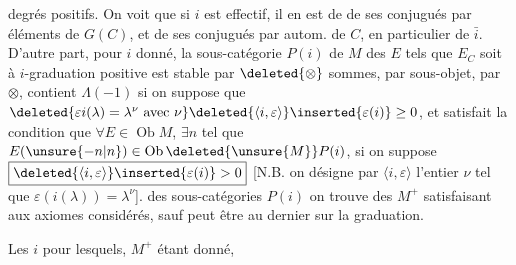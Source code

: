 degrés positifs. On voit que si $i$ est effectif, il en est de  de ses conjugués par éléments de $G(C)$, et de ses conjugués par autom. de $C$, en particulier de $\bar i$. D'autre part, pour $i$ donné, la sous-catégorie  $P(i)$ de $M$  des $E$ tels que $E_C$ soit à $i$-graduation positive est  stable par $\deleted{\otimes}$ sommes, par  sous-objet, par $\otimes$, contient  $\Lambda(-1)$ si on suppose que $\deleted{\varepsilon i(\lambda)=\lambda^\nu\ \text{avec }\nu}\deleted{\langle i,\varepsilon\rangle}\inserted{\varepsilon(i)}\geq 0$, et satisfait la condition que $\forall E\in\operatorname{Ob}M$, $\exists n$ tel que $E(\unsure{-n|n})\in\operatorname{Ob}\deleted{\unsure{M}}P(i)$, si on suppose $\boxed{\deleted{\langle i,\varepsilon\rangle}\inserted{\varepsilon(i)}>0}$ [N.B. on désigne par $\langle i,\varepsilon\rangle$ l'entier $\nu$ tel que $\varepsilon(i(\lambda))=\lambda^\nu$].   des sous-catégories $P(i)$ on trouve des $M^+$ satisfaisant aux axiomes considérés, sauf peut être au dernier sur la graduation. 

Les $i$ pour lesquels, $M^+$ étant donné,
